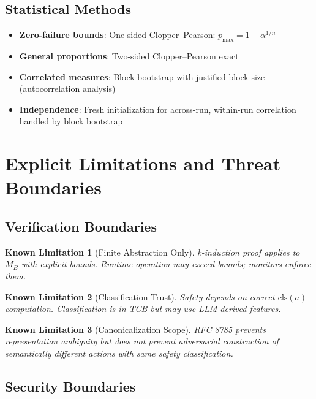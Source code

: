 \documentclass[12pt]{article}
\newtheorem{limitation}{Known Limitation}[section]
\begin{document}
\subsection{Statistical Methods}

\begin{itemize}
    \item \textbf{Zero-failure bounds}: One-sided Clopper--Pearson: $p_{\max} = 1 - \alpha^{1/n}$
    \item \textbf{General proportions}: Two-sided Clopper--Pearson exact
    \item \textbf{Correlated measures}: Block bootstrap with justified block size (autocorrelation analysis)
    \item \textbf{Independence}: Fresh initialization for across-run, within-run correlation handled by block bootstrap
\end{itemize}

\section{Explicit Limitations and Threat Boundaries}

\subsection{Verification Boundaries}

\begin{limitation}[Finite Abstraction Only]
k-induction proof applies to $M_B$ with explicit bounds. Runtime operation may exceed bounds; monitors enforce them.
\end{limitation}

\begin{limitation}[Classification Trust]
Safety depends on correct $\mathrm{cls}(a)$ computation. Classification is in TCB but may use LLM-derived features.
\end{limitation}

\begin{limitation}[Canonicalization Scope]
RFC 8785 prevents representation ambiguity but does not prevent adversarial construction of semantically different actions with same safety classification.
\end{limitation}

\subsection{Security Boundaries}
\end{document}
